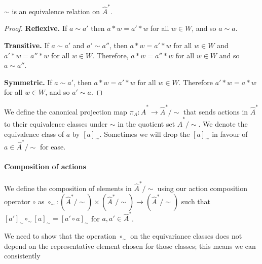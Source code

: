 \begin{proposition}
    $\sim$ is an equivalence relation on $\hat{A}^{\ast}$.
\end{proposition}
\begin{proof}
    \textbf{Reflexive.}
    If $a \sim a'$ then $a \ast w = a' \ast w$ for all $w \in W$, and so $a \sim a$.

    \textbf{Transitive.}
    If $a \sim a'$ and $a' \sim a''$, then $a \ast w = a' \ast w$ for all $w \in W$ and $a' \ast w = a'' \ast w$ for all $w \in W$.
    Therefore, $a \ast w = a'' \ast w$ for all $w \in W$ and so $a \sim a''$.

    \textbf{Symmetric.}
    If $a \sim a'$, then $a \ast w = a' \ast w$ for all $w \in W$.
    Therefore $a' \ast w = a \ast w$ for all $w \in W$, and so $a' \sim a$.
\end{proof}

We define the canonical projection map $\pi_{A}: \hat{A}^{\ast} \to \hat{A}^{\ast}/\sim$ that sends actions in $\hat{A}^{\ast}$ to their equivalence classes under $\sim$ in the quotient set $\hat{A}^{\ast}/\sim$.
We denote the equivalence class of $a$ by $[a]_{\sim}$.
Sometimes we will drop the $[a]_{\sim}$ in favour of $a \in \hat{A}^{\ast}/\sim$ for ease.

\paragraph{Composition of actions}
We define the composition of elements in $\hat{A}^{\ast}/\sim$ using our action composition operator $\circ$ as $\circ_{\sim}: (\hat{A}^{\ast}/\sim) \times (\hat{A}^{\ast}/\sim) \to (\hat{A}^{\ast}/\sim)$ such that $[a']_{\sim} \circ_{\sim} [a]_{\sim} = [a' \circ a]_{\sim}$ for $a,a' \in \hat{A}^{\ast}$.

We need to show that the operation $\circ_{\sim}$ on the equivariance classes does not depend on the representative element chosen for those classes; this means we can consistently 

